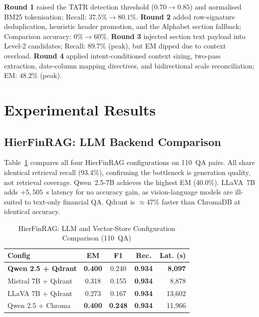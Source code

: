 \documentclass[conference]{IEEEtran}
\newcommand{\best}[1]{\textbf{#1}}
\begin{document}
\noindent\textbf{Round 1} raised the TATR detection threshold ($0.70 \to 0.85$)
and normalised BM25 tokenisation; Recall: $37.5\% \to 80.1\%$.
\textbf{Round 2} added row-signature deduplication, heuristic header promotion,
and the Alphabet section fallback; Comparison accuracy: $0\% \to 60\%$.
\textbf{Round 3} injected section text payload into Level-2 candidates;
Recall: $89.7\%$ (peak), but EM dipped due to context overload.
\textbf{Round 4} applied intent-conditioned context sizing, two-pass extraction,
date-column mapping directives, and bidirectional scale reconciliation;
EM: $48.2\%$ (peak).

\section{Experimental Results}

\subsection{HierFinRAG: LLM Backend Comparison}

Table~\ref{tab:hier} compares all four HierFinRAG configurations on 110~QA
pairs. All share identical retrieval recall (93.4\%), confirming the bottleneck
is generation quality, not retrieval coverage. Qwen~2.5-7B achieves the highest
EM (40.0\%). LLaVA~7B adds $+5{,}505$~s latency for no accuracy gain, as
vision-language models are ill-suited to text-only financial QA. Qdrant is
$\approx$47\% faster than ChromaDB at identical accuracy.

\begin{table}[htbp]
\caption{HierFinRAG: LLM and Vector-Store Configuration Comparison (110~QA)}
\label{tab:hier}
\centering
\renewcommand{\arraystretch}{1.2}
\begin{tabular}{l c c c r}
\toprule
\textbf{Config} & \textbf{EM} & \textbf{F1} & \textbf{Rec.} & \textbf{Lat. (s)} \\
\midrule
\textbf{Qwen 2.5 + Qdrant} & \best{0.400} & 0.240 & \best{0.934} & \best{8,097} \\
Mistral 7B + Qdrant & 0.318 & 0.155 & \best{0.934} & 8,878 \\
LLaVA 7B + Qdrant  & 0.273 & 0.167 & \best{0.934} & 13,602 \\
Qwen 2.5 + Chroma  & \best{0.400} & \best{0.248} & \best{0.934} & 11,966 \\
\bottomrule
\end{tabular}
\end{table}
\end{document}
